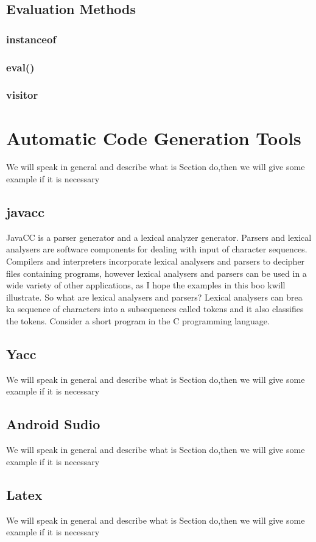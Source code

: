 \subsection{Evaluation Methods}

\subsubsection{instanceof}

\subsubsection{ eval()}

\subsubsection{visitor}



\section{Automatic Code Generation Tools}
We will speak in general and describe what is Section do,then we will give some example if it is necessary

\subsection{javacc}
JavaCC is a parser generator and a lexical analyzer generator. Parsers and lexical analysers
are software components for dealing with input of character sequences. Compilers and
interpreters incorporate lexical analysers and parsers to decipher files containing programs,
however lexical analysers and parsers can be used in a wide variety of other applications,
as I hope the examples in this boo kwill illustrate.
So what are lexical analysers and parsers? Lexical analysers can brea ka sequence of
characters into a subsequences called
tokens
and it also classifies the tokens. Consider a
short program in the C programming language.

\subsection{Yacc}
We will speak in general and describe what is Section do,then we will give some example if it is necessary


\subsection{Android Sudio}
We will speak in general and describe what is Section do,then we will give some example if it is necessary

\subsection{Latex}
We will speak in general and describe what is Section do,then we will give some example if it is necessary

